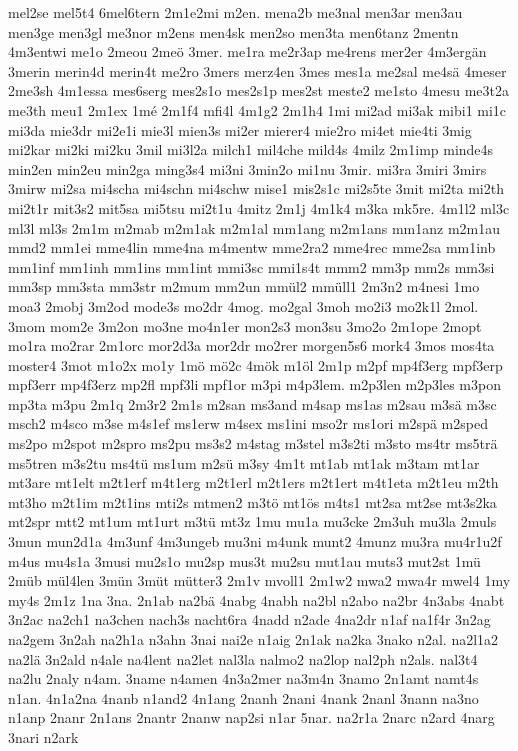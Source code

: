 {mel2se
mel5t4
6mel6tern
2m1e2mi
m2en.
mena2b
me3nal
men3ar
men3au
men3ge
men3gl
me3nor
m2ens
men4sk
men2so
men3ta
men6tanz
2mentn
4m3entwi
me1o
2meou
2meö
3mer.
me1ra
me2r3ap
me4rens
mer2er
4m3ergän
3merin
merin4d
merin4t
me2ro
3mers
merz4en
3mes
mes1a
me2sal
me4sä
4meser
2me3sh
4m1essa
mes6serg
mes2s1o
mes2s1p
mes2st
meste2
me1sto
4mesu
me3t2a
me3th
meu1
2m1ex
1mé
2m1f4
mfi4l
4m1g2
2m1h4
1mi
mi2ad
mi3ak
mibi1
mi1c
mi3da
mie3dr
mi2e1i
mie3l
mien3s
mi2er
mierer4
mie2ro
mi4et
mie4ti
3mig
mi2kar
mi2ki
mi2ku
3mil
mi3l2a
milch1
mil4che
mild4s
4milz
2m1imp
minde4s
min2en
min2eu
min2ga
ming3s4
mi3ni
3min2o
mi1nu
3mir.
mi3ra
3miri
3mirs
3mirw
mi2sa
mi4scha
mi4schn
mi4schw
mise1
mis2s1c
mi2s5te
3mit
mi2ta
mi2th
mi2t1r
mit3s2
mit5sa
mi5tsu
mi2t1u
4mitz
2m1j
4m1k4
m3ka
mk5re.
4m1l2
ml3c
ml3l
ml3s
2m1m
m2mab
m2m1ak
m2m1al
mm1ang
m2m1ans
mm1anz
m2m1au
mmd2
mm1ei
mme4lin
mme4na
m4mentw
mme2ra2
mme4rec
mme2sa
mm1inb
mm1inf
mm1inh
mm1ins
mm1int
mmi3sc
mmi1s4t
mmm2
mm3p
mm2s
mm3si
mm3sp
mm3sta
mm3str
m2mum
mm2un
mmül2
mmüll1
2m3n2
m4nesi
1mo
moa3
2mobj
3m2od
mode3s
mo2dr
4mog.
mo2gal
3moh
mo2i3
mo2k1l
2mol.
3mom
mom2e
3m2on
mo3ne
mo4n1er
mon2s3
mon3su
3mo2o
2m1ope
2mopt
mo1ra
mo2rar
2m1orc
mor2d3a
mor2dr
mo2rer
morgen5s6
mork4
3mos
mos4ta
moster4
3mot
m1o2x
mo1y
1mö
mö2c
4mök
m1öl
2m1p
m2pf
mp4f3erg
mpf3erp
mpf3err
mp4f3erz
mp2fl
mpf3li
mpf1or
m3pi
m4p3lem.
m2p3len
m2p3les
m3pon
mp3ta
m3pu
2m1q
2m3r2
2m1s
m2san
ms3and
m4sap
ms1as
m2sau
m3sä
m3sc
msch2
m4sco
m3se
m4s1ef
ms1erw
m4sex
ms1ini
mso2r
ms1ori
m2spä
m2sped
ms2po
m2spot
m2spro
ms2pu
ms3s2
m4stag
m3stel
m3s2ti
m3sto
ms4tr
ms5trä
ms5tren
m3s2tu
ms4tü
ms1um
m2sü
m3sy
4m1t
mt1ab
mt1ak
m3tam
mt1ar
mt3are
mt1elt
m2t1erf
m4t1erg
m2t1erl
m2t1ers
m2t1ert
m4t1eta
m2t1eu
m2th
mt3ho
m2t1im
m2t1ins
mti2s
mtmen2
m3tö
mt1ös
m4ts1
mt2sa
mt2se
mt3s2ka
mt2spr
mtt2
mt1um
mt1urt
m3tü
mt3z
1mu
mu1a
mu3cke
2m3uh
mu3la
2muls
3mun
mun2d1a
4m3unf
4m3ungeb
mu3ni
m4unk
munt2
4munz
mu3ra
mu4r1u2f
m4us
mu4s1a
3musi
mu2s1o
mu2sp
mus3t
mu2su
mut1au
muts3
mut2st
1mü
2müb
mül4len
3mün
3müt
mütter3
2m1v
mvoll1
2m1w2
mwa2
mwa4r
mwel4
1my
my4s
2m1z
1na
3na.
2n1ab
na2bä
4nabg
4nabh
na2bl
n2abo
na2br
4n3abs
4nabt
3n2ac
na2ch1
na3chen
nach3s
nacht6ra
4nadd
n2ade
4na2dr
n1af
na1f4r
3n2ag
na2gem
3n2ah
na2h1a
n3ahn
3nai
nai2e
n1aig
2n1ak
na2ka
3nako
n2al.
na2l1a2
na2lä
3n2ald
n4ale
na4lent
na2let
nal3la
nalmo2
na2lop
nal2ph
n2als.
nal3t4
na2lu
2naly
n4am.
3name
n4amen
4n3a2mer
na3m4n
3namo
2n1amt
namt4s
n1an.
4n1a2na
4nanb
n1and2
4n1ang
2nanh
2nani
4nank
2nanl
3nann
na3no
n1anp
2nanr
2n1ans
2nantr
2nanw
nap2si
n1ar
5nar.
na2r1a
2narc
n2ard
4narg
3nari
n2ark
}
